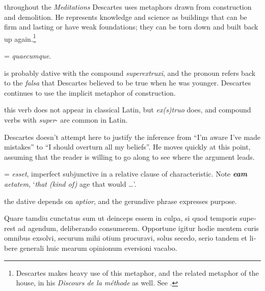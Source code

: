  throughout the \textit{Meditations} Descartes uses metaphors drawn from construction and demolition. He represents knowledge and science as buildings that can be firm and lasting or have weak foundations; they can be torn down and built back up again.\footnote{Descartes makes heavy use of this metaphor, and the related metaphor of the house, in his \textit{Discours de la méthode} as well. See \citet[22]{curtis1984}.}

 = \textit{quaecumque}.

 is probably dative with the compound \textit{superextruxi}, and the pronoun refers back to the \textit{falsa} that Descartes believed to be true when he was younger. Descartes continues to use the implicit metaphor of construction.

 this verb does not appear in classical Latin, but \textit{ex(s)truo} does, and compound verbs with \textit{super}- are common in Latin.

 Descartes doesn't attempt here to justify the inference from ``I'm aware I've made mistakes'' to ``I should overturn all my beliefs''. He moves quickly at this point, assuming that the reader is willing to go along to see where the argument leads. 

 = \textit{esset}, imperfect subjunctive in a relative clause of characteristic. Note \textit{\textbf{eam} aetatem}, `\textit{that (kind of)} age that would \dots'.

 the dative depends on \textit{aptior}, and the gerundive phrase expresses purpose.

\clearpage

\beginnumbering
\numberpstarttrue
\pstart
\begin{latin}
    Quare tamdiu cunctatus sum ut deinceps essem in culpa, si quod temporis superest ad agendum, deliberando consumerem. Opportune igitur hodie mentem curis omnibus exsolvi, securum mihi otium procuravi, solus secedo, serio tandem et libere generali huic mearum opinionum eversioni vacabo.
\end{latin}
\pend
\endnumbering


